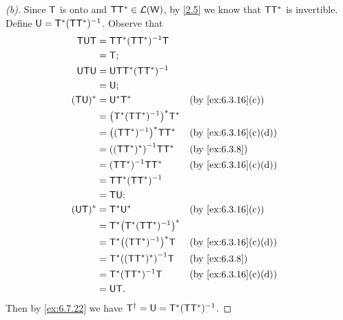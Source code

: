 \begin{proof}[(b)]
  Since \(\mathsf{T}\) is onto and \(\mathsf{T} \mathsf{T}^* \in \mathcal{L}(\mathsf{W})\), by \cref{2.5} we know that \(\mathsf{T} \mathsf{T}^*\) is invertible.
  Define \(\mathsf{U} = \mathsf{T}^* (\mathsf{T} \mathsf{T}^*)^{-1}\).
  Observe that
  \begin{align*}
    \T \U \T  & = \T \T^* (\T \T^*)^{-1} \T                                \\
              & = \T;                                                      \\
    \U \T \U  & = \U \T \T^* (\T \T^*)^{-1}                                \\
              & = \U;                                                      \\
    (\T \U)^* & = \U^* \T^*                       &  & \by{ex:6.3.16}[c]   \\
              & = \pa{\T^* (\T \T^*)^{-1}}^* \T^*                          \\
              & = \pa{(\T \T^*)^{-1}}^* \T \T^*   &  & \by{ex:6.3.16}[c,d] \\
              & = \pa{(\T \T^*)^*}^{-1} \T \T^*   &  & \by{ex:6.3.8}       \\
              & = (\T \T^*)^{-1} \T \T^*          &  & \by{ex:6.3.16}[c,d] \\
              & = \T \T^* (\T \T^*)^{-1}                                   \\
              & = \T \U;                                                   \\
    (\U \T)^* & = \T^* \U^*                       &  & \by{ex:6.3.16}[c]   \\
              & = \T^* \pa{\T^* (\T \T^*)^{-1}}^*                          \\
              & = \T^* \pa{(\T \T^*)^{-1}}^* \T   &  & \by{ex:6.3.16}[c,d] \\
              & = \T^* \pa{(\T \T^*)^*}^{-1} \T   &  & \by{ex:6.3.8}       \\
              & = \T^* (\T \T^*)^{-1} \T          &  & \by{ex:6.3.16}[c,d] \\
              & = \U \T.
  \end{align*}
  Then by \cref{ex:6.7.22} we have \(\mathsf{T}^{\dag} = \mathsf{U} = \mathsf{T}^* (\mathsf{T} \mathsf{T}^*)^{-1}\).
\end{proof}
